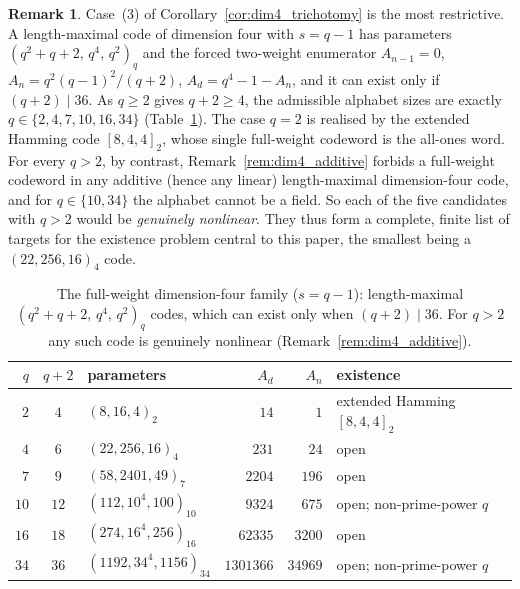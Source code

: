 \documentclass[12pt, letterpaper]{article}
\theoremstyle{plain}
\theoremstyle{definition}
\newtheorem{remark}[theorem]{Remark}
\begin{document}
	\begin{remark}\label{rem:dim4_q1_candidates}
		Case~(3) of Corollary~\ref{cor:dim4_trichotomy} is the most restrictive. A length-maximal code of dimension four with $s = q-1$ has parameters $(q^2+q+2,\, q^4,\, q^2)_q$ and the forced two-weight enumerator $A_{n-1} = 0$, $A_n = q^2(q-1)^2/(q+2)$, $A_d = q^4-1-A_n$, and it can exist only if $(q+2)\mid 36$. As $q \ge 2$ gives $q+2 \ge 4$, the admissible alphabet sizes are exactly $q \in \{2,4,7,10,16,34\}$ (Table~\ref{tab:dim4_candidates}). The case $q = 2$ is realised by the extended Hamming code $[8,4,4]_2$, whose single full-weight codeword is the all-ones word. For every $q > 2$, by contrast, Remark~\ref{rem:dim4_additive} forbids a full-weight codeword in any additive (hence any linear) length-maximal dimension-four code, and for $q \in \{10,34\}$ the alphabet cannot be a field. So each of the five candidates with $q > 2$ would be \emph{genuinely nonlinear}. They thus form a complete, finite list of targets for the existence problem central to this paper, the smallest being a $(22,256,16)_4$ code.
	\end{remark}

	\begin{table}[htbp]
		\centering
		\renewcommand{\arraystretch}{1.15}
		\caption{The full-weight dimension-four family ($s = q-1$): length-maximal $(q^2+q+2,\, q^4,\, q^2)_q$ codes, which can exist only when $(q+2)\mid 36$. For $q > 2$ any such code is genuinely nonlinear (Remark~\ref{rem:dim4_additive}).}
		\label{tab:dim4_candidates}
		\begin{tabular}{@{}rclrrl@{}}
			\toprule
			$q$ & $q+2$ & parameters & $A_d$ & $A_n$ & existence \\
			\midrule
			$2$  & $4$  & $(8,16,4)_2$            & $14$      & $1$     & extended Hamming $[8,4,4]_2$ \\
			$4$  & $6$  & $(22,256,16)_4$         & $231$     & $24$    & open \\
			$7$  & $9$  & $(58,2401,49)_7$        & $2204$    & $196$   & open \\
			$10$ & $12$ & $(112,10^4,100)_{10}$   & $9324$    & $675$   & open; non-prime-power $q$ \\
			$16$ & $18$ & $(274,16^4,256)_{16}$   & $62335$   & $3200$  & open \\
			$34$ & $36$ & $(1192,34^4,1156)_{34}$ & $1301366$ & $34969$ & open; non-prime-power $q$ \\
			\bottomrule
		\end{tabular}
	\end{table}
\end{document}
